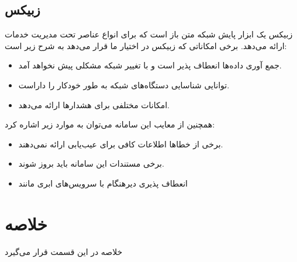 \newpage


\subsection{زبیکس}

زبیکس یک ابزار پایش شبکه متن باز است که برای انواع عناصر تحت مدیریت خدمات ارائه می‌دهد. برخی امکاناتی که زبیکس در اختیار ما قرار می‌دهد به شرح زیر است\cite{olups2010zabbix}:

\begin{itemize}
    \item جمع آوری داده‌ها انعطاف پذیر است و با تغییر شبکه مشکلی پیش نخواهد آمد.
    \item توانایی شناسایی دستگاه‌های شبکه به طور خودکار را داراست.
    \item امکانات مختلفی برای هشدارها ارائه می‌دهد.
\end{itemize}
همچنین از معایب این سامانه می‌توان به موارد زیر اشاره کرد:

\begin{itemize}
    \item برخی از خطاها اطلاعات کافی برای عیب‌یابی ارائه نمی‌دهند.
    \item برخی مستندات این سامانه باید بروز شوند.
    \item انعطاف پذیری دیرهنگام با سرویس‌های ابری مانند 
\end{itemize}


\newpage

\section{خلاصه}

خلاصه در این قسمت قرار می‌گیرد

